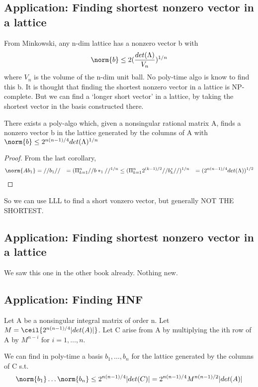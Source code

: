 \subsection{Application: Finding shortest nonzero vector in a lattice}

From Minkowski, any n-dim lattice has a nonzero vector b with 
\[ \norm{b} \leq 2 (\frac{det(\Lambda)}{V_n})^{1/n}\] 
where $V_n$ is the volume of the n-dim unit ball.  No poly-time algo is know to find this b. It is thought that finding the shortest nonzero vector in a lattice is NP-complete. But we can find a `longer short vector' in a lattice, by taking the shortest vector in the basis constructed there.


\begin{corollary}
There exists a poly-algo which, given a nonsingular rational matrix A, finds a nonzero vector b in the lattice generated by the columns of A with $\norm{b} \leq 2^{n(n-1)/4}det(\Lambda)^{1/n}$
\end{corollary}
\begin{proof}
From the last corollary, 
\begin{align*}
\norm{Ab_1} &= \snorm{b_1}
	&= (\Pi_{k=1}^n \snorm{b*_1}^{1/n}
	&\leq (\Pi_{k=1}^n 2^{(k-1)/2}\snorm{b^*_k})^{1/n}
	& = (2^{n(n-1)/4}det(\Lambda))^{1/2}
\end{align*}
\end{proof}

So we can use LLL to find a short vonzero vector, but generally NOT THE SHORTEST.



\subsection{Application: Finding shortest nonzero vector in a lattice}
We saw this one in the other book already. Nothing new.

\subsection{Application: Finding HNF}

Let A be a nonsingular integral matrix of order n. Let $M = \ceil{2^{n(n-1)/4}|det(A)|}$. Let C arise from A by multiplying the ith row of A by $M^{n-i}$ for $i=1, \dots, n$.

We can find in poly-time a basis $b_1, \dots, b_n$ for the lattice generated by the columns of C s.t.
\[\norm{b_1}\dots\norm{b_n} \leq 2^{n(n-1)/4}|det(C)| =  2^{n(n-1)/4}M^{n(n-1)/2}|det(A)|\]

